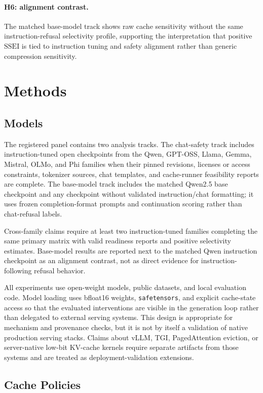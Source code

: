 \documentclass[11pt]{article}
\newcommand{\ssei}{\mathrm{SSEI}}
\begin{document}
\paragraph{H6: alignment contrast.}
The matched base-model track shows raw cache sensitivity without the same instruction-refusal selectivity profile, supporting the interpretation that positive $\ssei$ is tied to instruction tuning and safety alignment rather than generic compression sensitivity.

\section{Methods}

\subsection{Models}

The registered panel contains two analysis tracks. The chat-safety track includes instruction-tuned open checkpoints from the Qwen, GPT-OSS, Llama, Gemma, Mistral, OLMo, and Phi families when their pinned revisions, licenses or access constraints, tokenizer sources, chat templates, and cache-runner feasibility reports are complete. The base-model track includes the matched Qwen2.5 base checkpoint and any checkpoint without validated instruction/chat formatting; it uses frozen completion-format prompts and continuation scoring rather than chat-refusal labels.

Cross-family claims require at least two instruction-tuned families completing the same primary matrix with valid readiness reports and positive selectivity estimates. Base-model results are reported next to the matched Qwen instruction checkpoint as an alignment contrast, not as direct evidence for instruction-following refusal behavior.

All experiments use open-weight models, public datasets, and local evaluation code. Model loading uses bfloat16 weights, \texttt{safetensors}, and explicit cache-state access so that the evaluated interventions are visible in the generation loop rather than delegated to external serving systems.
This design is appropriate for mechanism and provenance checks, but it is not by itself a validation of native production serving stacks. Claims about vLLM, TGI, PagedAttention eviction, or server-native low-bit KV-cache kernels require separate artifacts from those systems and are treated as deployment-validation extensions.

\subsection{Cache Policies}
\end{document}
